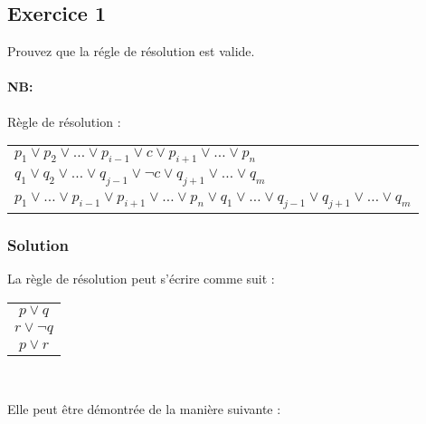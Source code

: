 


\subsection*{Exercice 1}
Prouvez que la régle de résolution est valide.

\paragraph*{NB:} Règle de résolution : 
 \begin{tabular}{l}
 $p_1 \vee p_2 \vee \ldots \vee p_{i - 1} \vee c \vee p_{i + 1} \vee \ldots \vee p_n$ \\
 $q_1 \vee q_2 \vee \ldots \vee q_{j - 1} \vee \neg c \vee q_{j + 1} \vee \ldots \vee q_m$ \\
 \hline
 $p_1 \vee \ldots \vee p_{i - 1} \vee p_{i + 1} \vee \ldots \vee p_n \vee q_1 \vee \ldots \vee q_{j - 1} \vee q_{j + 1} \vee \ldots \vee q_m$ 
 \end{tabular}

 \vspace{0.5cm}

    \subsubsection*{Solution}

La règle de résolution peut s'écrire comme suit :

\begin{center}
\begin{tabular}{c}
$p \lor q$ \\
$r \lor \neg q$\\
\hline
$p \lor r$\\
\end{tabular}\\
\end{center}

Elle peut être démontrée de la manière suivante :

